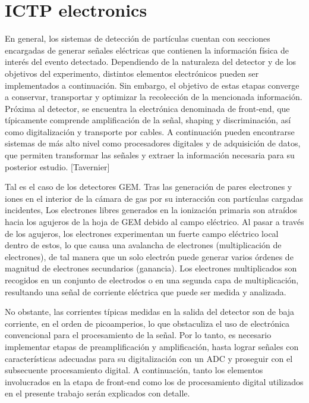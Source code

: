 \documentclass[]{book}
\begin{document}
\chapter{ICTP electronics}

\noindent En general, los sistemas de detección de partículas cuentan con secciones encargadas de generar señales eléctricas que contienen la información física de interés del evento detectado. Dependiendo de la naturaleza del detector y de los objetivos del experimento, distintos elementos electrónicos pueden ser implementados a continuación. Sin embargo, el objetivo de estas etapas converge a conservar, transportar y optimizar la recolección de la mencionada información. Próxima al detector, se encuentra la electrónica denominada de front-end, que típicamente comprende amplificación de la señal, shaping y discriminación, así como digitalización y transporte por cables. A continuación pueden encontrarse sistemas de más alto nivel como procesadores digitales y de adquisición de datos, que permiten transformar las señales y extraer la información necesaria para su posterior estudio. [Tavernier]

\noindent Tal es el caso de los detectores GEM. Tras las generación de pares electrones y iones en el interior de la cámara de gas por su interacción con partículas cargadas incidentes, Los electrones libres generados en la ionización primaria son atraídos hacia los agujeros de la hoja de GEM debido al campo eléctrico. Al pasar a través de los agujeros, los electrones experimentan un fuerte campo eléctrico local dentro de estos, lo que causa una avalancha de electrones (multiplicación de electrones), de tal manera que un solo electrón puede generar varios órdenes de magnitud de electrones secundarios (ganancia). Los electrones multiplicados son recogidos en un conjunto de electrodos o en una segunda capa de multiplicación, resultando una señal de corriente eléctrica que puede ser medida y analizada.

\noindent No obstante, las corrientes típicas medidas en la salida del detector son de baja corriente, en el orden de picoamperios, lo que obstaculiza el uso de electrónica convencional para el procesamiento de la señal. Por lo tanto, es necesario implementar etapas de preamplificación y amplificación, hasta lograr señales con características adecuadas para su digitalización con un ADC y proseguir con el subsecuente procesamiento digital. A continuación, tanto los elementos involucrados en la etapa de front-end como los de procesamiento digital utilizados en el presente trabajo serán explicados con detalle.
\end{document}
